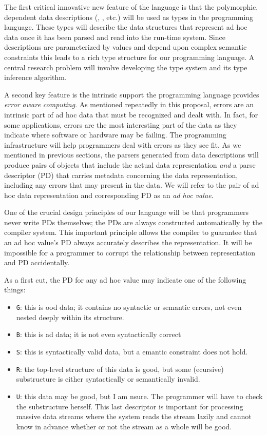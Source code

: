 \documentclass[11pt]{article}
\begin{document}
The first critical innovative new feature of the language
is that the polymorphic, dependent
data descriptions (, , etc.)
will be used as types in the programming language.  These
types will describe the data structures that represent
ad hoc data once it has been
parsed and read into the run-time system.  Since \datatype{} descriptions
are parameterized by values and depend upon complex semantic constraints
this leads to a rich type structure for our programming language.
A central research problem will involve developing the type system
and its type inference algorithm.

A second key feature is the intrinsic support the programming language provides
{\em error aware computing}.  As mentioned repeatedly in this proposal,
errors are an intrinsic part of ad hoc data that must be recognized
and dealt with.  In fact, for some applications, errors are the most interesting part of the data as they indicate where software or
hardware may be failing.  The \datatype{} programming infrastructure
will help programmers deal with errors as they see fit.
As we mentioned in previous
sections, the parsers generated from \datatype{} data descriptions
will produce pairs of objects that include
the actual data representation {\em and} a parse descriptor (PD)
that carries metadata concerning the data representation,
including any errors that may present in the data.
We will refer to the pair of ad hoc data representation and corresponding PD
as an {\em ad hoc value}.

One of the crucial design principles of our language will be
that programmers never write PDs themselves; the
PDs are always constructed automatically by the
compiler system.  This important principle allows the compiler
to guarantee that an ad hoc value's PD always accurately 
describes the representation.
It will be impossible for a programmer to corrupt the relationship
between representation and PD accidentally.  

As a first cut, the PD for any ad hoc
value may indicate one of the following things:
\begin{itemize}
\item {\tt G}: this is ood data; it contains no syntactic or 
semantic errors, not even nested deeply within its structure.
\item {\tt B}: this is ad data; it is not even syntactically correct
\item {\tt S}: this is syntactically valid data, but a emantic 
constraint does not hold.
\item {\tt R}: the top-level structure of this data is good, but some
(ecursive) substructure is either syntactically or semantically invalid.
\item {\tt U}: this data may be good, but I am nsure.  The programmer 
will have to check the substructure herself.  This last descriptor
is important for processing massive data streams where the system reads the
stream lazily and cannot know in advance whether or not the stream
as a whole will be good.
\end{itemize}
\end{document}

